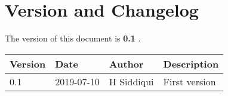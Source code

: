\section{Version and Changelog}

The version of this document is {\bf 0.1} .

\begin{table}[H]
    \begin{tabular}{|l|l|l|p{10cm}| }
    \hline
    {\bf Version} & {\bf Date} & {\bf Author} & {\bf Description} \\ \hline
    0.1 & 2019-07-10 & H Siddiqui & First version \\ \hline
    \end{tabular}
\end{table}

